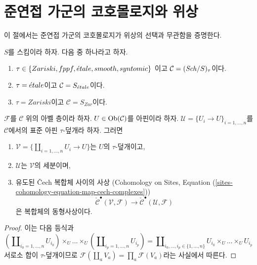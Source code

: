 \section{준연접 가군의 코호몰로지와 위상}
\label{section-quasi-coherent-cohomology}

\noindent
이 절에서는 준연접 가군의 코호몰로지가 위상의 선택과 무관함을 증명한다.

\begin{lemma}
\label{lemma-standard-covering-Cech}
$S$를 스킴이라 하자. 다음 중 하나라고 하자.
\begin{enumerate}
\item[(a)] $\tau \in \{Zariski, \linebreak[0] fppf, \linebreak[0]
\etale, \linebreak[0] smooth, \linebreak[0] syntomic\}$
이고 $\mathcal{C} = (\mathit{Sch}/S)_\tau$이다.
\item[(b)] $\tau = {\acute{e}tale}$이고 $\mathcal{C} = S_{\acute{e}tale}$이다.
\item[(c)] $\tau = Zariski$이고 $\mathcal{C} = S_{Zar}$이다.
\end{enumerate}
$\mathcal{F}$를 $\mathcal{C}$ 위의 아벨 층이라 하자.
$U \in \mathop{\mathrm{Ob}}\nolimits(\mathcal{C})$를 아핀이라 하자.
$\mathcal{U} = \{U_i \to U\}_{i = 1, \ldots, n}$를 $\mathcal{C}$에서의
표준 아핀 $\tau$-덮개라 하자. 그러면
\begin{enumerate}
\item $\mathcal{V} = \{\coprod_{i = 1, \ldots, n} U_i \to U\}$는
$U$의 $\tau$-덮개이고,
\item $\mathcal{U}$는 $\mathcal{V}$의 세분이며,
\item 유도된 {\v C}ech 복합체 사이의 사상
(Cohomology on Sites, Equation
(\ref{sites-cohomology-equation-map-cech-complexes}))
$$
\check{\mathcal{C}}^\bullet(\mathcal{V}, \mathcal{F})
\longrightarrow
\check{\mathcal{C}}^\bullet(\mathcal{U}, \mathcal{F})
$$
은 복합체의 동형사상이다.
\end{enumerate}
\end{lemma}

\begin{proof}
이는 다음 등식과
$$
(\coprod\nolimits_{i_0 = 1, \ldots, n} U_{i_0}) \times_U
\ldots \times_U
(\coprod\nolimits_{i_p = 1, \ldots, n} U_{i_p})
=
\coprod\nolimits_{i_0, \ldots, i_p \in \{1, \ldots, n\}}
U_{i_0} \times_U \ldots \times_U U_{i_p}
$$
서로소 합이 $\tau$-덮개이므로
$\mathcal{F}(\coprod_a V_a) = \prod_a \mathcal{F}(V_a)$라는 사실에서 따른다.
\end{proof}

